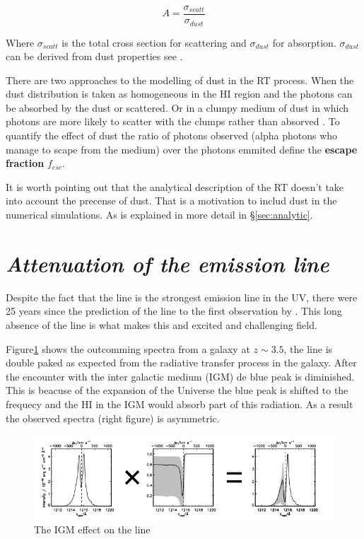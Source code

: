 \begin{equation}
A = \dfrac{\sigma_{scatt}}{\sigma_{dust}}
\end{equation}

Where $\sigma_{scatt}$ is the total cross section for scattering 
and $\sigma_{dust}$ for absorption. $\sigma_{dust}$ can be derived from 
dust properties see \citep{Laursen09}. 

There are two approaches to the modelling of dust in the \ly RT process.
When the dust distribution is taken as homogeneous in the HI region and 
the \ly photons can be absorbed by the dust or scattered. Or in a clumpy
medium of dust in which \ly photons are more likely to scatter with the 
clumps rather than absorved \citep{Laursen13}. To quantify the effect of 
dust the ratio
of \ly photons observed (\ly alpha photons who manage to scape from the medium) 
over the \ly photons emmited  define the {\bf{escape fraction}} $f_{esc}$. 

It is worth pointing out that the analytical
description of the \ly RT doesn't take into account the precense of
dust. That is a motivation to includ dust in the numerical simulations.
As is explained in more detail in \S \ref{sec:analytic}.  





\section{\emph{ Attenuation of the \ly emission line}}

Despite the fact that the \ly line is the strongest emission line in 
the UV, there were 25 years since the prediction of the \ly line to 
the first observation by \citep{DjorgovskiThompson92}. 
This long absence of the \ly line is what makes this and excited and 
challenging field.

Figure\ref{fig:IGM} shows the outcomming spectra from a galaxy 
at $z \sim 3.5$, the line is double paked as expected from 
the radiative transfer process in the galaxy. After the encounter
with the inter galactic medium (IGM) de blue peak is diminished.
This is beacuse of the expansion of the Universe the blue peak 
is shifted to the \ly frequecy and the HI in the IGM would absorb
part of this radiation. As a result the observed spectra (right figure)
is asymmetric.   

\begin{figure}[H]\label{fig:IGM}
\begin{center}
\includegraphics[scale=0.6]{../Figures/ISM.png}
\end{center}\caption{The IGM effect on the \ly line}
\end{figure}


